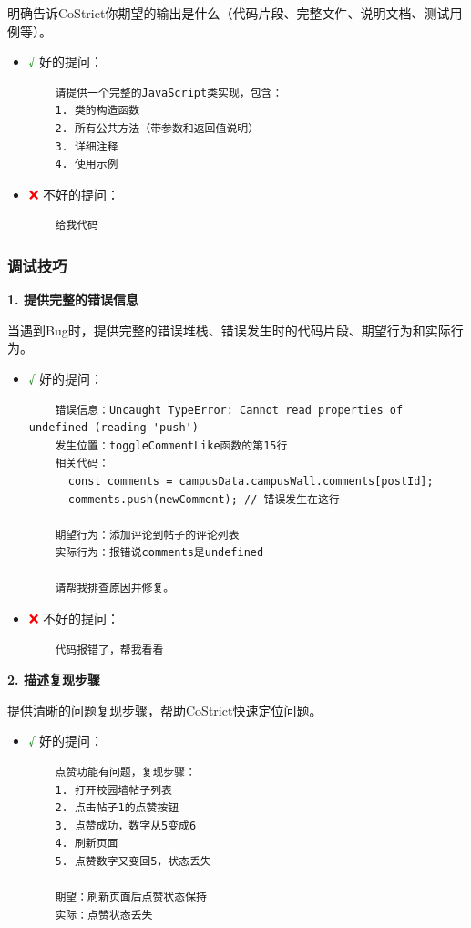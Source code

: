 ﻿\documentclass[12pt,a4paper]{article}
\begin{document}
明确告诉CoStrict你期望的输出是什么（代码片段、完整文件、说明文档、测试用例等）。

\begin{itemize}
    \item \textcolor{green}{√} 好的提问：
    \begin{verbatim}
    请提供一个完整的JavaScript类实现，包含：
    1. 类的构造函数
    2. 所有公共方法（带参数和返回值说明）
    3. 详细注释
    4. 使用示例
    \end{verbatim}
    \item \textcolor{red}{❌} 不好的提问：
    \begin{verbatim}
    给我代码
    \end{verbatim}
\end{itemize}

\subsubsection{调试技巧}

\textbf{1. 提供完整的错误信息}

当遇到Bug时，提供完整的错误堆栈、错误发生时的代码片段、期望行为和实际行为。

\begin{itemize}
    \item \textcolor{green}{√} 好的提问：
    \begin{verbatim}
    错误信息：Uncaught TypeError: Cannot read properties of undefined (reading 'push')
    发生位置：toggleCommentLike函数的第15行
    相关代码：
      const comments = campusData.campusWall.comments[postId];
      comments.push(newComment); // 错误发生在这行
    
    期望行为：添加评论到帖子的评论列表
    实际行为：报错说comments是undefined
    
    请帮我排查原因并修复。
    \end{verbatim}
    \item \textcolor{red}{❌} 不好的提问：
    \begin{verbatim}
    代码报错了，帮我看看
    \end{verbatim}
\end{itemize}

\textbf{2. 描述复现步骤}

提供清晰的问题复现步骤，帮助CoStrict快速定位问题。

\begin{itemize}
    \item \textcolor{green}{√} 好的提问：
    \begin{verbatim}
    点赞功能有问题，复现步骤：
    1. 打开校园墙帖子列表
    2. 点击帖子1的点赞按钮
    3. 点赞成功，数字从5变成6
    4. 刷新页面
    5. 点赞数字又变回5，状态丢失
    
    期望：刷新页面后点赞状态保持
    实际：点赞状态丢失
    \end{verbatim}
\end{itemize}
\end{document}
